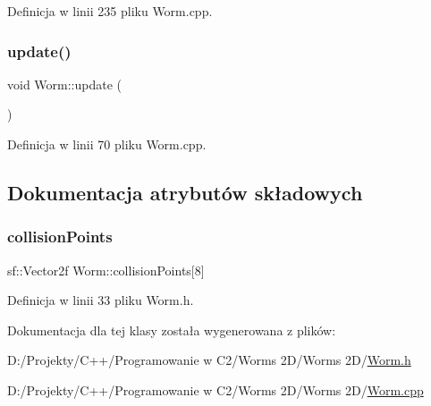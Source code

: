 Definicja w linii 235 pliku Worm.\+cpp.

\mbox{\label{class_worm_adcb6219ae98887e491327c4ef02cf4b9}} 
\subsubsection{\texorpdfstring{update()}{update()}}
{\footnotesize\ttfamily void Worm\+::update (\begin{DoxyParamCaption}{ }\end{DoxyParamCaption})}



Definicja w linii 70 pliku Worm.\+cpp.



\subsection{Dokumentacja atrybutów składowych}
\mbox{\label{class_worm_a6e519d20cdeca0c88847c0b7284ca302}} 
\subsubsection{\texorpdfstring{collision\+Points}{collisionPoints}}
{\footnotesize\ttfamily sf\+::\+Vector2f Worm\+::collision\+Points\mbox{[}8\mbox{]}}



Definicja w linii 33 pliku Worm.\+h.



Dokumentacja dla tej klasy została wygenerowana z plików\+:\begin{DoxyCompactItemize}
\item 
D\+:/\+Projekty/\+C++/\+Programowanie w C2/\+Worms 2\+D/\+Worms 2\+D/\mbox{\hyperlink{_worm_8h}{Worm.\+h}}\item 
D\+:/\+Projekty/\+C++/\+Programowanie w C2/\+Worms 2\+D/\+Worms 2\+D/\mbox{\hyperlink{_worm_8cpp}{Worm.\+cpp}}\end{DoxyCompactItemize}
